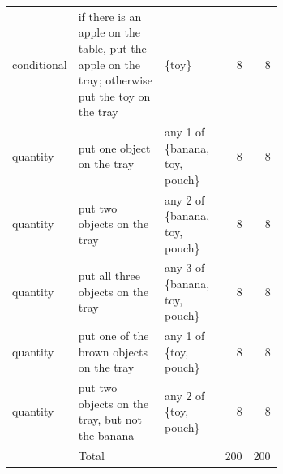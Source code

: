 {\begin{longtable}{l p{0.42\linewidth} p{0.24\linewidth} r r}
conditional & if there is an apple on the table, put the apple on the tray; otherwise put the toy on the tray & \{toy\} & 8 & 8 \\
quantity & put one object on the tray & any 1 of \{banana, toy, pouch\} & 8 & 8 \\
quantity & put two objects on the tray & any 2 of \{banana, toy, pouch\} & 8 & 8 \\
quantity & put all three objects on the tray & any 3 of \{banana, toy, pouch\} & 8 & 8 \\
quantity & put one of the brown objects on the tray & any 1 of \{toy, pouch\} & 8 & 8 \\
quantity & put two objects on the tray, but not the banana & any 2 of \{toy, pouch\} & 8 & 8 \\
\midrule
 & Total & & 200 & 200 \\
\bottomrule
\end{longtable}}

